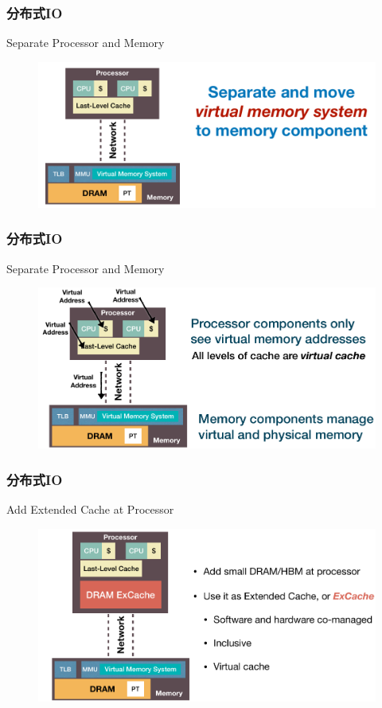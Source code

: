 \begin{frame}[fragile]
    \frametitle{分布式IO}
   Separate Processor and Memory
    \begin{figure}
        \includegraphics[width=0.9\linewidth]{figs/disio-cpu-mem.png}
    \end{figure}
\end{frame}
\begin{frame}[fragile]
    \frametitle{分布式IO}
    Separate Processor and Memory
    \begin{figure}
        \includegraphics[width=0.9\linewidth]{figs/disio-cpu-mem-2.png}
    \end{figure}
\end{frame}

\begin{frame}[fragile]
    \frametitle{分布式IO}
    Add Extended Cache at Processor
    \begin{figure}
        \includegraphics[width=0.8\linewidth]{figs/disio-cpu-mem-3.png}
    \end{figure}
\end{frame}

